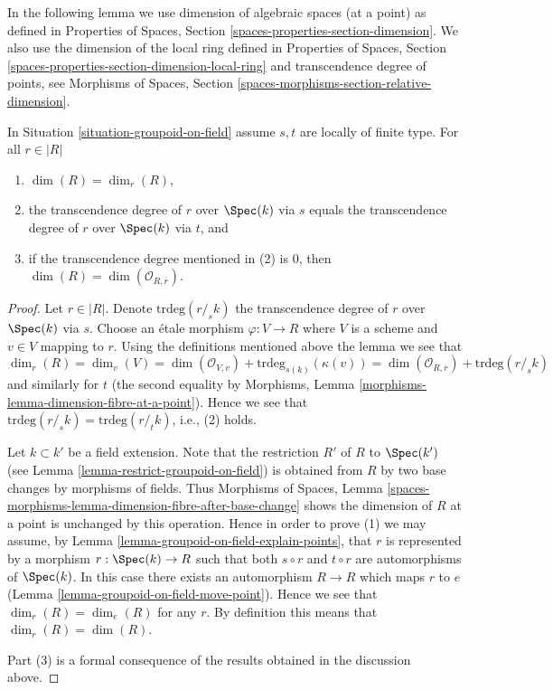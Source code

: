\noindent
In the following lemma we use dimension of algebraic spaces (at a point)
as defined in
Properties of Spaces, Section \ref{spaces-properties-section-dimension}.
We also use the dimension of the local ring defined in
Properties of Spaces, Section
\ref{spaces-properties-section-dimension-local-ring}
and transcendence degree of points, see
Morphisms of Spaces, Section \ref{spaces-morphisms-section-relative-dimension}.

\begin{lemma}
\label{lemma-groupoid-on-field-locally-finite-type-dimension}
In
Situation \ref{situation-groupoid-on-field}
assume $s, t$ are locally of finite type.
For all $r \in |R|$
\begin{enumerate}
\item $\dim(R) = \dim_r(R)$,
\item the transcendence degree of $r$ over $\Spec(k)$
via $s$ equals the transcendence degree of $r$ over $\Spec(k)$
via $t$, and
\item if the transcendence degree mentioned in (2) is $0$, then
$\dim(R) = \dim(\mathcal{O}_{R, \overline{r}})$.
\end{enumerate}
\end{lemma}

\begin{proof}
Let $r \in |R|$. Denote $\text{trdeg}(r/_{\!\! s}k)$ the transcendence
degree of $r$ over $\Spec(k)$ via $s$. Choose an \'etale morphism
$\varphi : V \to R$ where $V$ is a scheme and $v \in V$ mapping to $r$.
Using the definitions mentioned above the lemma we see that
$$
\dim_r(R) = \dim_v(V) =
\dim(\mathcal{O}_{V, v}) + \text{trdeg}_{s(k)}(\kappa(v)) =
\dim(\mathcal{O}_{R, \overline{r}}) + \text{trdeg}(r/_{\!\! s}k)
$$
and similarly for $t$ (the second equality by
Morphisms, Lemma \ref{morphisms-lemma-dimension-fibre-at-a-point}).
Hence we see that $\text{trdeg}(r/_{\!\! s}k) = \text{trdeg}(r/_{\!\! t}k)$,
i.e., (2) holds.

\medskip\noindent
Let $k \subset k'$ be a field extension. Note that the restriction $R'$
of $R$ to $\Spec(k')$ (see
Lemma \ref{lemma-restrict-groupoid-on-field})
is obtained from $R$ by two base changes by morphisms of fields. Thus
Morphisms of Spaces,
Lemma \ref{spaces-morphisms-lemma-dimension-fibre-after-base-change}
shows the dimension of $R$ at a point is unchanged by this operation.
Hence in order to prove (1) we may assume, by
Lemma \ref{lemma-groupoid-on-field-explain-points},
that $r$ is represented by a morphism $r : \Spec(k) \to R$ such
that both $s \circ r$ and $t \circ r$ are automorphisms of $\Spec(k)$.
In this case there exists an automorphism $R \to R$ which maps $r$ to $e$
(Lemma \ref{lemma-groupoid-on-field-move-point}).
Hence we see that $\dim_r(R) = \dim_e(R)$ for any $r$. By definition this
means that $\dim_r(R) = \dim(R)$.

\medskip\noindent
Part (3) is a formal consequence of the results obtained in the discussion
above.
\end{proof}

